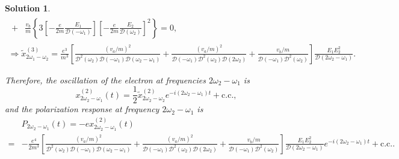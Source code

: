 \documentclass[UTF8,10pt,a4paper]{article}
\theoremstyle{Problem}
\theoremstyle{Solution}
\newtheorem*{sol}{Solution}
\begin{document}
\begin{sol}
\begin{gather}
\begin{align}
            +          & \frac{v_b}{m}\left\{3\left[-\frac{e}{2m}\frac{E_1}{\mathcal{D}(-\omega_1)}\right]\left[-\frac{e}{2m}\frac{E_2}{\mathcal{D}(\omega_2)}\right]^2\right\}=0,
        \end{align}\\
        \Longrightarrow\tilde{x}_{2\omega_1-\omega_2}^{(3)}=\frac{e^3}{m^3}\left[\frac{(v_a/m)^2}{\mathcal{D}^2(\omega_2)\mathcal{D}(-\omega_1)\mathcal{D}(\omega_2-\omega_1)}+\frac{(v_a/m)^2}{\mathcal{D}(-\omega_1)\mathcal{D}^2(\omega_2)\mathcal{D}(2\omega_2)}+\frac{v_b/m}{\mathcal{D}(-\omega_1)\mathcal{D}^2(\omega_2)}\right]\frac{E_1E_2^2}{\mathcal{D}(2\omega_2-\omega_1)}.
    \end{gather}

    Therefore, the oscillation of the electron at frequencies $2\omega_2-\omega_1$ is
    \begin{equation}
        x_{2\omega_2-\omega_1}^{(2)}(t)=\frac{1}{2}\tilde{x}_{2\omega_2-\omega_2}^{(2)}e^{-i(2\omega_2-\omega_1)t}+\text{c.c.},
    \end{equation}
    and the polarization response at frequency $2\omega_2-\omega_1$ is
    \begin{align}
        \nonumber & P_{2\omega_2-\omega_1}(t)=-ex_{2\omega_2-\omega_1}^{(2)}(t)                                                                                                                                                                                                                                                                                                           \\
        =         & -\frac{e^4}{2m^3}\left[\frac{(v_a/m)^2}{\mathcal{D}^2(\omega_2)\mathcal{D}(-\omega_1)\mathcal{D}(\omega_2-\omega_1)}+\frac{(v_a/m)^2}{\mathcal{D}(-\omega_1)\mathcal{D}^2(\omega_2)\mathcal{D}(2\omega_2)}+\frac{v_b/m}{\mathcal{D}(-\omega_1)\mathcal{D}^2(\omega_2)}\right]\frac{E_1E_2^2}{\mathcal{D}(2\omega_2-\omega_1)}e^{-i(2\omega_2-\omega_1)t}+\text{c.c.}.
    \end{align}
\end{sol}
\end{document}
